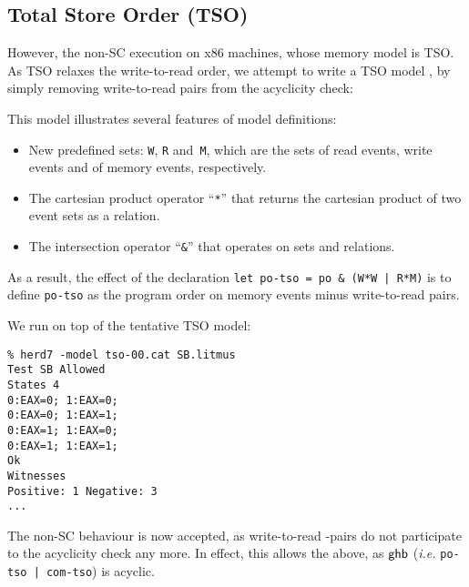 \subsection{Total Store Order (TSO)}
However, the non-SC execution  on x86 machines,
whose memory model is TSO. As TSO relaxes the write-to-read order, we attempt
to write a TSO model , by simply removing write-to-read
pairs from the acyclicity check:

This model illustrates several features
of model definitions:
\begin{itemize}
\item New predefined sets: \verb+W+, \verb+R+ and~\verb+M+, which are
the sets of read events, write events and of memory events, respectively.
\item The cartesian product operator ``\verb+*+'' that returns the cartesian
product of two event sets as a relation.
\item The intersection operator ``\verb+&+'' that operates on sets and
relations.
\end{itemize}
As a result, the effect of the declaration
\verb+let po-tso = po & (W*W | R*M)+ is to define \verb+po-tso+
as the program order on memory events minus write-to-read pairs.

We run  on top of the tentative TSO model:
\begin{verbatim}
% herd7 -model tso-00.cat SB.litmus 
Test SB Allowed
States 4
0:EAX=0; 1:EAX=0;
0:EAX=0; 1:EAX=1;
0:EAX=1; 1:EAX=0;
0:EAX=1; 1:EAX=1;
Ok
Witnesses
Positive: 1 Negative: 3
...
\end{verbatim}
\label{sb:image}The non-SC behaviour is now accepted, as write-to-read -pairs
do not participate to the acyclicity check any more. In effect, this allows
the  above,
as $\textsf{ghb}$ (\emph{i.e.}
\verb+po-tso | com-tso+) is acyclic.
\begin{center}\end{center}


